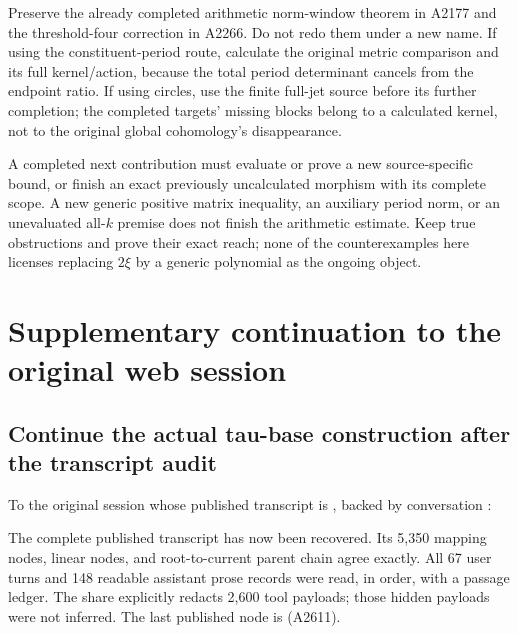 \documentclass[10pt,a4paper,oneside]{report}
\begin{document}
Preserve the already completed arithmetic norm-window theorem in A2177
and the threshold-four correction in A2266. Do not redo them under a new
name. If using the constituent-period route, calculate the original
metric comparison and its full kernel/action, because the total period
determinant cancels from the endpoint ratio. If using circles, use the
finite full-jet source before its further completion; the completed
targets' missing blocks belong to a calculated kernel, not to the
original global cohomology's disappearance.

A completed next contribution must evaluate or prove a new
source-specific bound, or finish an exact previously uncalculated
morphism with its complete scope. A new generic positive matrix
inequality, an auxiliary period norm, or an unevaluated all-\(k\)
premise does not finish the arithmetic estimate. Keep true obstructions
and prove their exact reach; none of the counterexamples here licenses
replacing \(2\xi\) by a generic polynomial as the ongoing object.

\clearpage

\chapter{Supplementary continuation to the original web
session}\label{supplementary-continuation-to-the-original-web-session}

\section{Continue the actual tau-base construction after the transcript
audit}\label{continue-the-actual-tau-base-construction-after-the-transcript-audit}

To the original session whose published transcript is
\href{https://chatgpt.com/share/6aa6bc6e-98cc-83eb-9343-e811c26d6631}{\protect{}},
backed by conversation
\protect{}:

The complete published transcript has now been recovered. Its 5,350
mapping nodes, linear nodes, and root-to-current parent chain agree
exactly. All 67 user turns and 148 readable assistant prose records were
read, in order, with a passage ledger. The share explicitly redacts
2,600 tool payloads; those hidden payloads were not inferred. The last
published node is \protect{}
(A2611).
\end{document}
